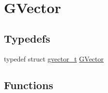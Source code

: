 \hypertarget{group___g_vector}{}\section{G\+Vector}
\label{group___g_vector}
\subsection*{Typedefs}
\begin{DoxyCompactItemize}
\item 
typedef struct \hyperlink{structgvector__t}{gvector\+\_\+t} \hyperlink{group___g_vector_ga6d90d5e6b721779a43354f2752b79281}{G\+Vector}
\end{DoxyCompactItemize}
\subsection*{Functions}
